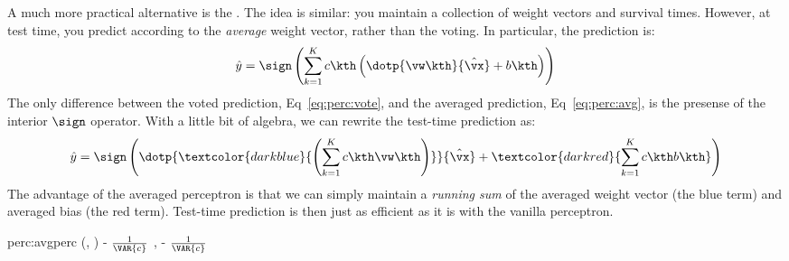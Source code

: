 
A much more practical alternative is the .  The idea is similar: you maintain a collection of
weight vectors and survival times.  However, at test time, you predict
according to the \emph{average} weight vector, rather than the
voting.  In particular, the prediction is:
\begin{equation} \label{eq:perc:avg}
  \hat y = \sign \left(
    \sum_{k=1}^K c\kth
      \left(
        \dotp{\vw\kth}{\hat\vx} + b\kth
        \right)
      \right)
\end{equation}
The only difference between the voted prediction,
Eq~\eqref{eq:perc:vote}, and the averaged prediction,
Eq~\eqref{eq:perc:avg}, is the presense of the interior $\sign$
operator.  With a little bit of algebra, we can rewrite the test-time
prediction as:
\begin{equation}
  \hat y = \sign \left(
    \dotp{\textcolor{darkblue}{\left(
        \sum_{k=1}^K c\kth \vw\kth
        \right)}}{\hat\vx} +
      \textcolor{darkred}{\sum_{k=1}^K c\kth b\kth}
      \right)
\end{equation}
The advantage of the averaged perceptron is that we can simply
maintain a \emph{running sum} of the averaged weight vector (the blue
term) and averaged bias (the red term).  Test-time prediction is then
just as efficient as it is with the vanilla perceptron.

\newalgorithm%
  {perc:avgperc}%
  {(, )}
  {
\ENDIF
{}
\ENDFOR
\ENDFOR
\RETURN \VAR{$\vw$} - $\frac 1 {\VAR{c}}$ ,
           - $\frac 1 {\VAR{c}}$ \VAR{$\beta$}
}

